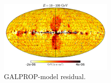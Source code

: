 \begin{figure}[h]
 \includegraphics[width=0.5\textwidth]{plots/Mollweide_GALPROP_source_range2.pdf}
 \caption{GALPROP-model residual.}
 \label{fig:Maps_GALPROP}
\end{figure}
%
%
